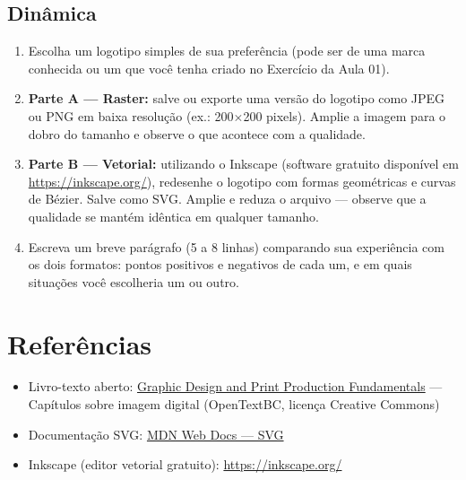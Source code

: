 \documentclass[a4paper,12pt]{article}
\begin{document}
\subsection*{Dinâmica}
\begin{enumerate}[nosep]
  \item Escolha um logotipo simples de sua preferência (pode ser de uma marca conhecida ou um que você tenha criado no Exercício da Aula 01).
  \item \textbf{Parte A --- Raster:} salve ou exporte uma versão do logotipo como JPEG ou PNG em baixa resolução (ex.: 200$\times$200 pixels). Amplie a imagem para o dobro do tamanho e observe o que acontece com a qualidade.
  \item \textbf{Parte B --- Vetorial:} utilizando o Inkscape (software gratuito disponível em \url{https://inkscape.org/}), redesenhe o logotipo com formas geométricas e curvas de Bézier. Salve como SVG. Amplie e reduza o arquivo --- observe que a qualidade se mantém idêntica em qualquer tamanho.
  \item Escreva um breve parágrafo (5 a 8 linhas) comparando sua experiência com os dois formatos: pontos positivos e negativos de cada um, e em quais situações você escolheria um ou outro.
\end{enumerate}

\section{Referências}

\begin{itemize}[nosep]
  \item Livro-texto aberto: \href{https://opentextbc.ca/graphicdesign/}{Graphic Design and Print Production Fundamentals} --- Capítulos sobre imagem digital (OpenTextBC, licença Creative Commons)
  \item Documentação SVG: \href{https://developer.mozilla.org/pt-BR/docs/Web/SVG}{MDN Web Docs --- SVG}
  \item Inkscape (editor vetorial gratuito): \href{https://inkscape.org/}{https://inkscape.org/}
\end{itemize}

\end{document}
